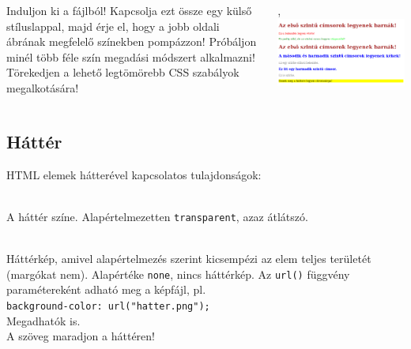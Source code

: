 \begin{frame}
  \begin{columns}[c]
      Induljon ki a  
      fájlból! Kapcsolja ezt össze egy külső stíluslappal, majd 
      érje el, hogy a jobb oldali ábrának megfelelő színekben 
      pompázzon! Próbáljon minél több féle szín megadási 
      módszert alkalmazni! Törekedjen a lehető legtömörebb CSS 
      szabályok megalkotására!
      \begin{exampleblock}{, 
        }
        \includegraphics[width=\textwidth]{szinezes-mo.png}
      \end{exampleblock}
  \end{columns} 
\end{frame}

\subsection{Háttér}

\begin{frame}
  HTML elemek hátterével kapcsolatos tulajdonságok:
  \begin{description}[m]
    \item[\texttt{background-color}] \hfill \\ A háttér színe. 
    Alapértelmezetten \texttt{transparent}, azaz átlátszó.
    \item[\texttt{background-image}] \hfill \\ Háttérkép, amivel 
    alapértelmezés szerint kicsempézi az elem teljes területét 
    (margókat nem). 
    Alapértéke \texttt{none}, nincs háttérkép. Az \texttt{url()} 
    függvény paramétereként adható meg a képfájl, pl. \\
    \texttt{background-color: url("hatter.png");} \\Megadhatók 
     is.\\
    A szöveg maradjon  a háttéren!
  \end{description}
\end{frame}

